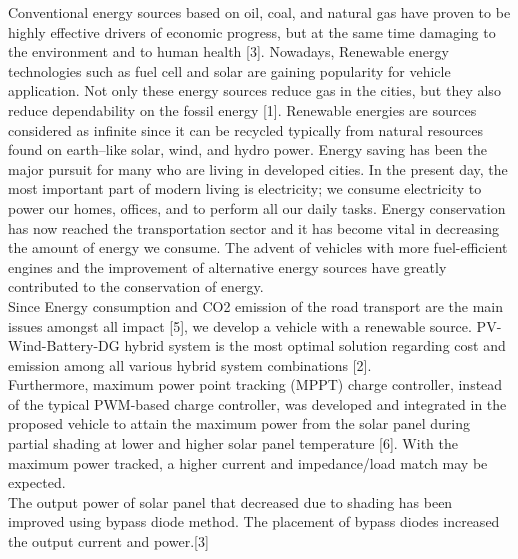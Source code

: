 \documentclass[a4paper,12pt]{article}
\begin{document}
Conventional energy sources based on oil, coal, and natural gas have proven to be highly effective drivers of economic progress, but at the same time damaging to the environment and to human health [3]. Nowadays, Renewable energy technologies such as fuel cell and solar are gaining popularity for vehicle application. Not only these energy sources reduce gas in the cities, but they also reduce dependability on the fossil energy [1]. Renewable energies are sources considered as infinite since it can be recycled typically from natural resources found on earth–like solar, wind, and hydro power. Energy saving has been the major pursuit for many who are living in developed cities. In the present day, the most important part of modern living is electricity; we consume electricity to power our homes, offices, and to perform all our daily tasks. Energy conservation has now reached the transportation sector and it has become vital in decreasing the amount of energy we consume. The advent of vehicles with more fuel-efficient engines and the improvement of alternative energy sources have greatly contributed to the conservation of energy.\\

Since Energy consumption and CO2 emission of the road transport are the main issues amongst all impact [5], we develop a vehicle with a renewable source. PV-Wind-Battery-DG hybrid system is the most optimal solution regarding cost and emission among all various hybrid system combinations [2].\\

Furthermore, maximum power point tracking (MPPT) charge controller, instead of the typical PWM-based charge controller, was developed and integrated in the proposed vehicle to attain the maximum power from the solar panel during partial shading at lower and higher solar panel temperature [6]. With the maximum power tracked, a higher current and impedance/load match may be expected.\\

The output power of solar panel that decreased
due to shading has been improved using
bypass diode method. The placement of bypass
diodes increased the output current and power.[3]\\
\end{document}
